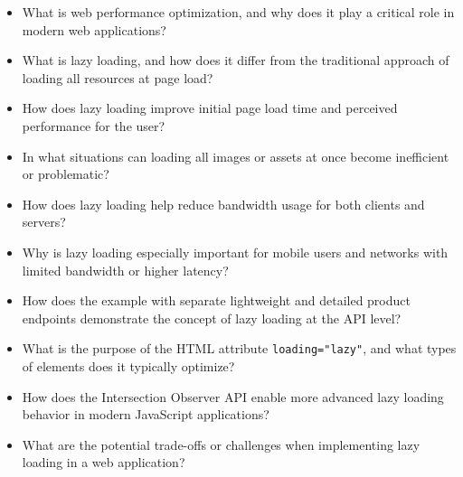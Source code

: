\medskip

\begin{itemize}
    \item What is web performance optimization, and why does it play a critical role in modern web applications?

    \item What is lazy loading, and how does it differ from the traditional approach of loading all resources at page load?

    \item How does lazy loading improve initial page load time and perceived performance for the user?

    \item In what situations can loading all images or assets at once become inefficient or problematic?

    \item How does lazy loading help reduce bandwidth usage for both clients and servers?

    \item Why is lazy loading especially important for mobile users and networks with limited bandwidth or higher latency?

    \item How does the example with separate lightweight and detailed product endpoints demonstrate the concept of lazy loading at the API level?

    \item What is the purpose of the HTML attribute \texttt{loading="lazy"}, and what types of elements does it typically optimize?

    \item How does the Intersection Observer API enable more advanced lazy loading behavior in modern JavaScript applications?

    \item What are the potential trade-offs or challenges when implementing lazy loading in a web application?
\end{itemize}

